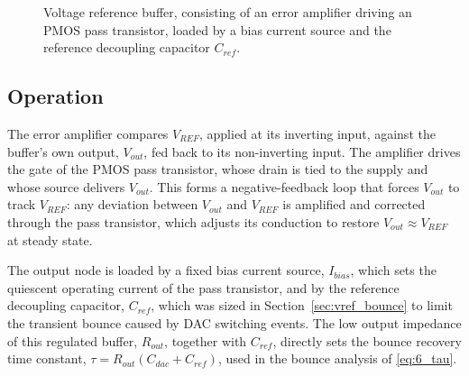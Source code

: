 \begin{figure}[h]
	\centering
{}
	\caption{Voltage reference buffer, consisting of an error amplifier
		driving an PMOS pass transistor, loaded by a bias current source and
		the reference decoupling capacitor $C_{ref}$.}
	\label{fig:vref_buffer_schematic}
\end{figure}

\subsection{Operation}

The error amplifier compares $V_{REF}$, applied at its inverting input,
against the buffer's own output, $V_{out}$, fed back to its
non-inverting input. The amplifier drives the gate of the PMOS pass
transistor, whose drain is tied to the supply and whose source delivers
$V_{out}$. This forms a negative-feedback loop that forces $V_{out}$ to
track $V_{REF}$: any deviation between $V_{out}$ and $V_{REF}$ is
amplified and corrected through the pass transistor, which adjusts its
conduction to restore $V_{out} \approx V_{REF}$ at steady state.

The output node is loaded by a fixed bias current source, $I_{bias}$,
which sets the quiescent operating current of the pass transistor, and by
the reference decoupling capacitor, $C_{ref}$, which was sized in
Section~\ref{sec:vref_bounce} to limit the transient bounce caused by
DAC switching events. The low output impedance of this regulated buffer,
$R_{out}$, together with $C_{ref}$, directly sets the bounce recovery
time constant, $\tau = R_{out}(C_{dac} + C_{ref})$, used in the bounce
analysis of \eqref{eq:6_tau}.


